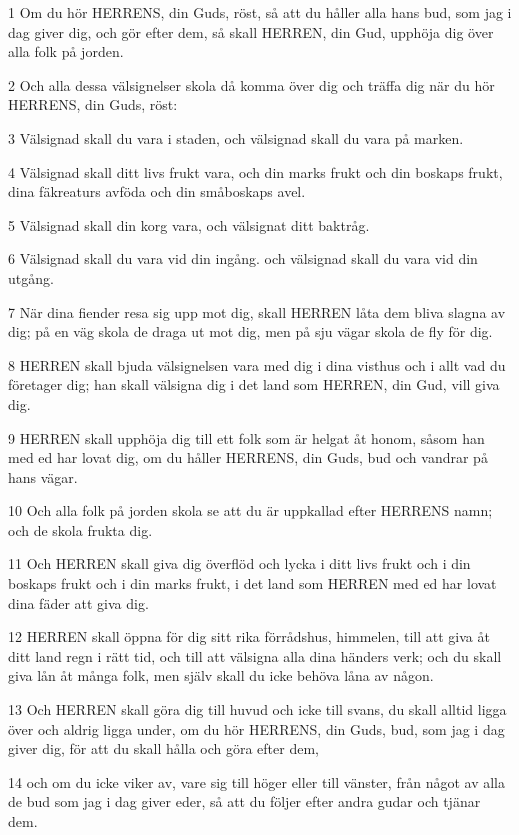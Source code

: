 \par 1 Om du hör HERRENS, din Guds, röst, så att du håller alla hans bud, som jag i dag giver dig, och gör efter dem, så skall HERREN, din Gud, upphöja dig över alla folk på jorden.
\par 2 Och alla dessa välsignelser skola då komma över dig och träffa dig när du hör HERRENS, din Guds, röst:
\par 3 Välsignad skall du vara i staden, och välsignad skall du vara på marken.
\par 4 Välsignad skall ditt livs frukt vara, och din marks frukt och din boskaps frukt, dina fäkreaturs avföda och din småboskaps avel.
\par 5 Välsignad skall din korg vara, och välsignat ditt baktråg.
\par 6 Välsignad skall du vara vid din ingång. och välsignad skall du vara vid din utgång.
\par 7 När dina fiender resa sig upp mot dig, skall HERREN låta dem bliva slagna av dig; på en väg skola de draga ut mot dig, men på sju vägar skola de fly för dig.
\par 8 HERREN skall bjuda välsignelsen vara med dig i dina visthus och i allt vad du företager dig; han skall välsigna dig i det land som HERREN, din Gud, vill giva dig.
\par 9 HERREN skall upphöja dig till ett folk som är helgat åt honom, såsom han med ed har lovat dig, om du håller HERRENS, din Guds, bud och vandrar på hans vägar.
\par 10 Och alla folk på jorden skola se att du är uppkallad efter HERRENS namn; och de skola frukta dig.
\par 11 Och HERREN skall giva dig överflöd och lycka i ditt livs frukt och i din boskaps frukt och i din marks frukt, i det land som HERREN med ed har lovat dina fäder att giva dig.
\par 12 HERREN skall öppna för dig sitt rika förrådshus, himmelen, till att giva åt ditt land regn i rätt tid, och till att välsigna alla dina händers verk; och du skall giva lån åt många folk, men själv skall du icke behöva låna av någon.
\par 13 Och HERREN skall göra dig till huvud och icke till svans, du skall alltid ligga över och aldrig ligga under, om du hör HERRENS, din Guds, bud, som jag i dag giver dig, för att du skall hålla och göra efter dem,
\par 14 och om du icke viker av, vare sig till höger eller till vänster, från något av alla de bud som jag i dag giver eder, så att du följer efter andra gudar och tjänar dem.
